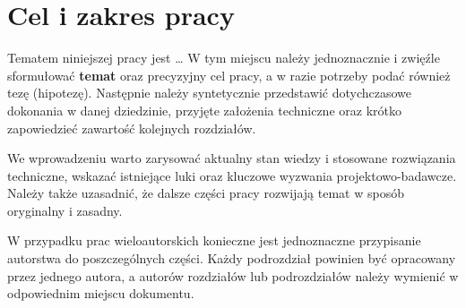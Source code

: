 \section{Cel i zakres pracy}
Tematem niniejszej pracy jest \dots \: W tym miejscu należy jednoznacznie i zwięźle sformułować \textbf{temat} oraz precyzyjny cel pracy, a w razie potrzeby podać również tezę (hipotezę). Następnie należy syntetycznie przedstawić dotychczasowe dokonania w danej dziedzinie, przyjęte założenia techniczne oraz krótko zapowiedzieć zawartość kolejnych rozdziałów.

We wprowadzeniu warto zarysować aktualny stan wiedzy i stosowane rozwiązania techniczne, wskazać istniejące luki oraz kluczowe wyzwania projektowo-badawcze. Należy także uzasadnić, że dalsze części pracy rozwijają temat w sposób oryginalny i zasadny.

W przypadku prac wieloautorskich konieczne jest jednoznaczne przypisanie autorstwa do poszczególnych części. Każdy podrozdział powinien być opracowany przez jednego autora, a autorów rozdziałów lub podrozdziałów należy wymienić w odpowiednim miejscu dokumentu.
